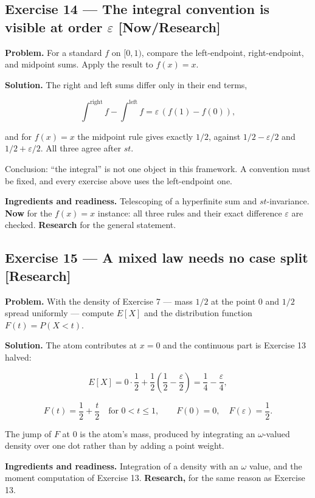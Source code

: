 \documentclass[11pt]{article}
\newcommand{\eps}{\varepsilon}
\renewcommand{\epsilon}{\varepsilon}
\begin{document}
\subsection*{Exercise 14 --- The integral convention is visible at order $\eps$ \hfill \normalfont\small[Now/Research]}

\textbf{Problem.} For a standard $f$ on $[0,1)$, compare the left-endpoint,
right-endpoint, and midpoint sums. Apply the result to $f(x) = x$.

\textbf{Solution.} The right and left sums differ only in their end terms,

\[
\int^{\text{right}}f-\int^{\text{left}}f=\epsilon\,(f(1)-f(0)),
\]

and for $f(x) = x$ the midpoint rule gives exactly $1/2$, against
$1/2 - \eps/2$ and $1/2 + \eps/2$. All three agree after $st$.

Conclusion: ``the integral'' is not one object in this framework. A convention
must be fixed, and every exercise above uses the left-endpoint one.

\textbf{Ingredients and readiness.} Telescoping of a hyperfinite sum and
$st$-invariance. \textbf{Now} for the $f(x) = x$ instance: all three rules and their
exact difference $\eps$ are checked. \textbf{Research} for the general
statement.


\subsection*{Exercise 15 --- A mixed law needs no case split \hfill \normalfont\small[Research]}

\textbf{Problem.} With the density of Exercise 7 --- mass $1/2$ at the point $0$ and
$1/2$ spread uniformly --- compute $E[X]$ and the distribution function
$F(t) = P(X < t)$.

\textbf{Solution.} The atom contributes at $x = 0$ and the continuous part is
Exercise 13 halved:

\[
E[X]=0\cdot\frac12+\frac12\left(\frac12-\frac\epsilon2\right)
=\frac14-\frac\epsilon4 ,
\]

\[
F(t)=\frac12+\frac t2 \quad\text{for } 0<t\le1,
\qquad F(0)=0,\quad F(\epsilon)=\frac12 .
\]

The jump of $F$ at $0$ is the atom's mass, produced by integrating an
$\omega$-valued density over one dot rather than by adding a point weight.

\textbf{Ingredients and readiness.} Integration of a density with an $\omega$ value,
and the moment computation of Exercise 13. \textbf{Research,} for the same reason
as Exercise 13.
\end{document}
